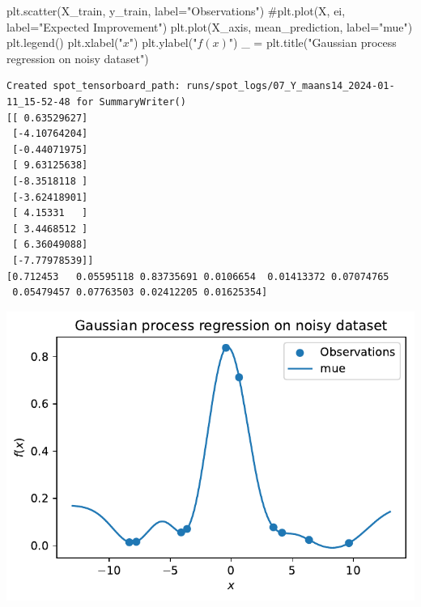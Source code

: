 \documentclass[
  letterpaper,
  DIV=11,
  numbers=noendperiod]{scrreprt}
\newenvironment{Shaded}{\begin{snugshade}}{\end{snugshade}}
\newcommand{\CommentTok}[1]{\textcolor[rgb]{0.37,0.37,0.37}{#1}}
\newcommand{\NormalTok}[1]{\textcolor[rgb]{0.00,0.23,0.31}{#1}}
\newcommand{\OperatorTok}[1]{\textcolor[rgb]{0.37,0.37,0.37}{#1}}
\newcommand{\StringTok}[1]{\textcolor[rgb]{0.13,0.47,0.30}{#1}}
\begin{document}
\begin{Shaded}
\begin{Highlighting}[]
\NormalTok{plt.scatter(X\_train, y\_train, label}\OperatorTok{=}\StringTok{"Observations"}\NormalTok{)}
\CommentTok{\#plt.plot(X, ei, label="Expected Improvement")}
\NormalTok{plt.plot(X\_axis, mean\_prediction, label}\OperatorTok{=}\StringTok{"mue"}\NormalTok{)}
\NormalTok{plt.legend()}
\NormalTok{plt.xlabel(}\StringTok{"$x$"}\NormalTok{)}
\NormalTok{plt.ylabel(}\StringTok{"$f(x)$"}\NormalTok{)}
\NormalTok{\_ }\OperatorTok{=}\NormalTok{ plt.title(}\StringTok{"Gaussian process regression on noisy dataset"}\NormalTok{)}
\end{Highlighting}
\end{Shaded}

\begin{verbatim}
Created spot_tensorboard_path: runs/spot_logs/07_Y_maans14_2024-01-11_15-52-48 for SummaryWriter()
[[ 0.63529627]
 [-4.10764204]
 [-0.44071975]
 [ 9.63125638]
 [-8.3518118 ]
 [-3.62418901]
 [ 4.15331   ]
 [ 3.4468512 ]
 [ 6.36049088]
 [-7.77978539]]
[0.712453   0.05595118 0.83735691 0.0106654  0.01413372 0.07074765
 0.05479457 0.07763503 0.02412205 0.01625354]
\end{verbatim}

\includegraphics{012_num_spot_ei_files/figure-pdf/cell-55-output-2.pdf}
\end{document}
